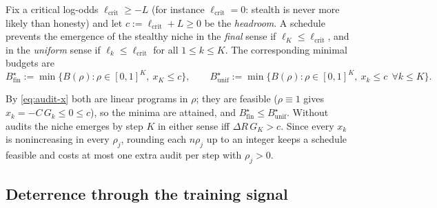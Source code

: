 \begin{definition}\label{def:audit-budgets}
Fix a critical log-odds $\ell_{\mathrm{crit}}\ge -L$ (for instance
$\ell_{\mathrm{crit}}=0$: stealth is never more likely than honesty) and let
$c:=\ell_{\mathrm{crit}}+L\ge0$ be the \emph{headroom}. A schedule prevents the
emergence of the stealthy niche in the \emph{final} sense if
$\ell_K\le\ell_{\mathrm{crit}}$, and in the \emph{uniform} sense if
$\ell_k\le\ell_{\mathrm{crit}}$ for all $1\le k\le K$. The corresponding minimal
budgets are
\[
  B^\star_{\mathrm{fin}}:=\min\{B(\rho):\rho\in[0,1]^K,\ x_K\le c\},\qquad
  B^\star_{\mathrm{unif}}:=\min\{B(\rho):\rho\in[0,1]^K,\ x_k\le c\ \ \forall k\le K\}.
\]
\end{definition}
By \eqref{eq:audit-x} both are linear programs in $\rho$; they are feasible
($\rho\equiv1$ gives $x_k=-C\,G_k\le0\le c$), so the minima are attained, and
$B^\star_{\mathrm{fin}}\le B^\star_{\mathrm{unif}}$. Without audits the niche
emerges by step $K$ in either sense iff $\Delta R\,G_K>c$. Since every $x_k$ is
nonincreasing in every $\rho_j$, rounding each $n\rho_j$ up to an integer keeps
a schedule feasible and costs at most one extra audit per step with $\rho_j>0$.

\subsection{Deterrence through the training signal}

